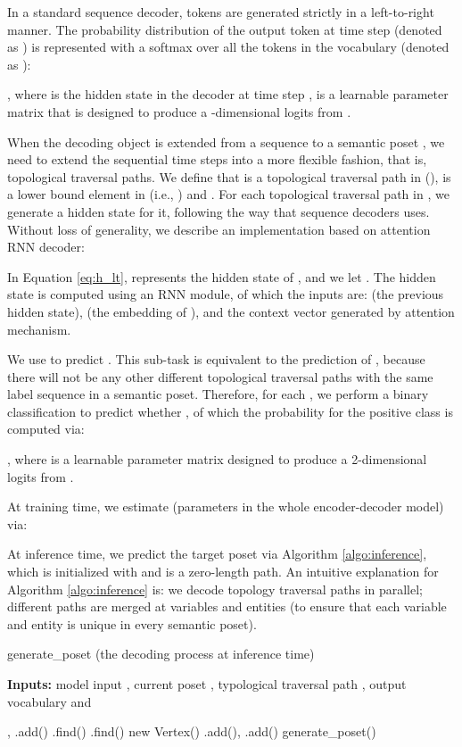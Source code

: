\documentclass{article}
\begin{document}
In a standard sequence decoder, tokens are generated strictly in a left-to-right manner.
The probability distribution of the output token at time step  (denoted as ) is represented with a softmax over all the tokens in the vocabulary (denoted as ):



, where  is the hidden state in the decoder at time step ,  is a learnable parameter matrix that is designed to produce a -dimensional logits from .

When the decoding object is extended from a sequence to a semantic poset , we need to extend the sequential time steps into a more flexible fashion, that is, topological traversal paths.
We define that  is a topological traversal path in  (),  is a lower bound element in  (i.e., ) and . For each topological traversal path  in , we generate a hidden state  for it, following the way that sequence decoders uses.
Without loss of generality, we describe an implementation based on attention RNN decoder:



In Equation \ref{eq:h_lt},  represents the hidden state of , and we let .
The hidden state  is computed using an RNN module, of which the inputs are:  (the previous hidden state),  (the embedding of ), and the context vector  generated by attention mechanism.

We use  to predict .
This sub-task is equivalent to the prediction of , because there will not be any other different topological traversal paths with the same label sequence in a semantic poset.
Therefore, for each , we perform a binary classification to predict whether , of which the probability for the positive class is computed via:



, where  is a learnable parameter matrix designed to produce a 2-dimensional logits from .

At training time, we estimate  (parameters in the whole encoder-decoder model) via:



At inference time, we predict the target poset via Algorithm \ref{algo:inference}, which is initialized with  and  is a zero-length path.
An intuitive explanation for Algorithm \ref{algo:inference} is:
we decode topology traversal paths in parallel;
different paths are merged at variables and entities (to ensure that each variable and entity is unique in every semantic poset).

\begin{algorithm}[t]
\caption{generate\_poset (the decoding process at inference time)}
\hspace*{0.02in} {\bf Inputs:}
model input , current poset , typological traversal path , output vocabulary  and 
\begin{algorithmic}[1]
\State , 
\For{}
    \If{}
        \State .add()
    \EndIf
\EndFor
\For{} \If{}
        \State .find()
    \Else
        \State .find()
    \EndIf
        \State  new Vertex()
    \EndIf
    \State .add(), .add()
\EndFor
\For{}
    \State generate\_poset()
\EndFor
\State \Return 
\end{algorithmic}
\label{algo:inference}
\end{algorithm}
\end{document}
